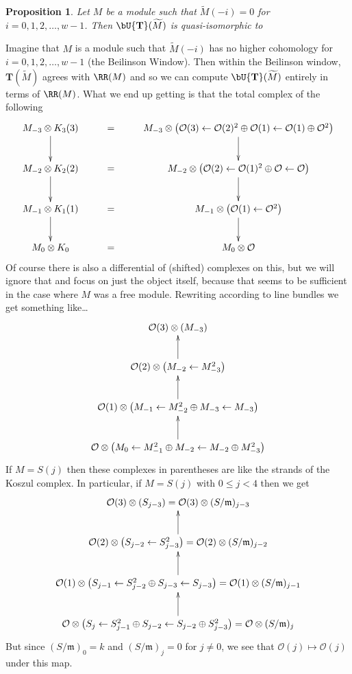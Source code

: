 \documentclass[12pt]{amsart}
\newtheorem{prop}[lemma]{Proposition}
\theoremstyle{definition}
\theoremstyle{remark}
\newcommand{\Tate}{{\mathbf{T}}}
\newcommand{\cO}{{\mathcal O}}
\begin{document}
\begin{prop}
Let $M$ be a module such that $\widetilde{M}(-i)=0$ for $i=0,1,2,\dots,w-1$.  Then $\bU \Tate(\widetilde{M})$ is quasi-isomorphic to 
\end{prop}
Imagine that $M$ is a module such that $\widetilde{M}(-i)$ has no higher cohomology for $i= 0 ,1, 2, \dots, w-1$ (the Beilinson Window). Then within the Beilinson window, $\Tate(\widetilde{M})$ agrees with $\RR(M)$ and so we can compute $\bU \Tate(\widetilde{M})$ entirely in terms of $\RR(M)$.  What we end up getting is that the total complex of the following
\[
\xymatrix{
M_{-3}\otimes K_3(3) \ar[d]&=& M_{-3}\otimes \left( \cO(3)\gets \cO(2)^2 \oplus \cO(1) \gets \cO(1)\oplus \cO^2\right)\ar[d]\\
M_{-2}\otimes K_2(2) \ar[d]&=& M_{-2}\otimes \left( \cO(2)\gets \cO(1)^2 \oplus \cO \gets \cO \right)\ar[d]\\
M_{-1}\otimes K_1(1) \ar[d]&=& M_{-1}\otimes \left( \cO(1)\gets \cO^2 \right)\ar[d]\\
M_0\otimes K_0 &=& M_0\otimes \cO
}
\]
Of course there is also a differential of (shifted) complexes on this, but we will ignore that and focus on just the object itself, because that seems to be sufficient in the case where $M$ was a free module.  Rewriting according to line bundles we get something like\dots
\[
\xymatrix{
\cO(3)\otimes \left( M_{-3}\right)\\
\cO(2) \otimes\left( M_{-2} \gets M_{-3}^2\right)\ar[u]\\
\cO(1)\otimes \left( M_{-1} \gets M_{-2}^2\oplus M_{-3} \gets M_{-3}\right)\ar[u]\\
\cO \otimes \left( M_{0} \gets M_{-1}^2\oplus M_{-2} \gets M_{-2}\oplus M_{-3}^2\right)\ar[u]\\
}
\]
If $M=S(j)$ then these complexes in parentheses are like the strands of the Koszul complex.  In particular, if $M=S(j)$ with $0\leq j <4$ then we get
\[
\xymatrix{
\cO(3)\otimes \left( S_{j-3}\right) = \cO(3) \otimes  (S/\mathfrak m)_{j-3}\\
\cO(2) \otimes\left( S_{j-2} \gets S_{j-3}^2\right)=\cO(2) \otimes  (S/\mathfrak m)_{j-2}\ar[u]\\
\cO(1)\otimes \left( S_{j-1} \gets S_{j-2}^2\oplus S_{j-3} \gets S_{j-3}\right)=\cO(1) \otimes  (S/\mathfrak m)_{j-1}\ar[u]\\
\cO \otimes \left( S_{j} \gets S_{j-1}^2\oplus S_{j-2} \gets S_{j-2}\oplus S_{j -3}^2\right)=\cO \otimes  (S/\mathfrak m)_{j}\ar[u]\\
}
\]
But since $ (S/\mathfrak m)_0 = k$ and $ (S/\mathfrak m)_j=0$ for $j\ne 0$, we see that $\cO(j)\mapsto \cO(j)$ under this map.  
\end{document}
